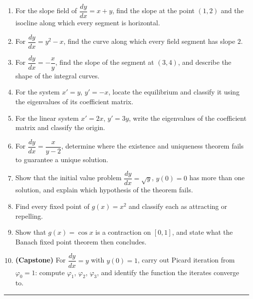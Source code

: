 \begin{enumerate}[leftmargin=2em]
    \item For the slope field of $\dfrac{dy}{dx} = x + y$, find the slope at the
          point $(1,2)$ and the isocline along which every segment is
          horizontal.

    \item For $\dfrac{dy}{dx} = y^{2} - x$, find the curve along which every
          field segment has slope $2$.

    \item For $\dfrac{dy}{dx} = -\dfrac{x}{y}$, find the slope of the segment at
          $(3,4)$, and describe the shape of the integral curves.

    \item For the system $x' = y$, $y' = -x$, locate the equilibrium and
          classify it using the eigenvalues of its coefficient matrix.

    \item For the linear system $x' = 2x$, $y' = 3y$, write the eigenvalues of
          the coefficient matrix and classify the origin.

    \item For $\dfrac{dy}{dx} = \dfrac{x}{y - 2}$, determine where the existence
          and uniqueness theorem fails to guarantee a unique solution.

    \item Show that the initial value problem $\dfrac{dy}{dx} = \sqrt{y}$,
          $y(0) = 0$ has more than one solution, and explain which hypothesis of
          the theorem fails.

    \item Find every fixed point of $g(x) = x^{2}$ and classify each as
          attracting or repelling.

    \item Show that $g(x) = \cos x$ is a contraction on $[0,1]$, and state what
          the Banach fixed point theorem then concludes.

    \item \textbf{(Capstone)} For $\dfrac{dy}{dx} = y$ with $y(0) = 1$, carry out
          Picard iteration from $\varphi_0 = 1$: compute $\varphi_1$,
          $\varphi_2$, $\varphi_3$, and identify the function the iterates
          converge to.
\end{enumerate}

\vspace{0.4em}
\hrule
\vspace{0.6em}


